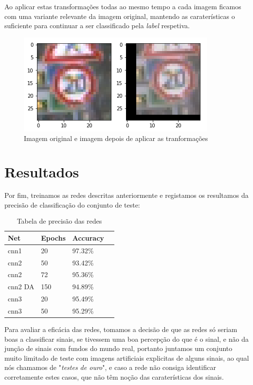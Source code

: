 \documentclass[a4paper]{report}
\begin{document}
Ao aplicar estas transformações todas ao mesmo tempo a cada imagem ficamos com uma
variante relevante da imagem original, mantendo as caraterísticas o suficiente para
continuar a ser classificado pela \textit{label} respetiva.

\begin{figure}[H]
    \centering
    \includegraphics{images/augment.png}
    \caption{Imagem original e imagem depois de aplicar as tranformações}
\end{figure}

\chapter{Resultados}
\label{chapter:results}

Por fim, treinamos as redes descritas anteriormente e registamos os resultamos da
precisão de classificação do conjunto de teste:

\begin{table}[H]
    \centering
    \begin{tabular}{|l|l|l|l|}
        \hline
        Net     & Epochs & Accuracy \\ \hline
        cnn1    & 20     & 97.32\%  \\ \hline
        cnn2    & 50     & 93.42\%  \\ \hline
        cnn2    & 72     & 95.36\%  \\ \hline
        cnn2 DA & 150    & 94.89\%  \\ \hline
        cnn3    & 20     & 95.49\%  \\ \hline
        cnn3    & 50     & 95.29\%  \\ \hline
    \end{tabular}
    \caption{Tabela de precisão das redes}
\end{table}

Para avaliar a eficácia das redes, tomamos a decisão de que as redes só seriam boas
a classificar sinais, se tivessem uma boa percepção do que é o sinal, e não da junção
de sinais com fundos do mundo real, portanto juntamos um conjunto muito limitado de
teste com imagens artificiais explicitas de alguns sinais, ao qual nós chamamos de
"\textit{testes de ouro}", e caso a rede não consiga identificar corretamente estes
casos, que não têm noção das caraterísticas dos sinais.
\end{document}

